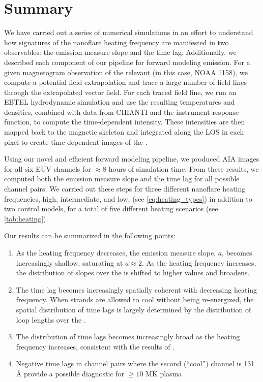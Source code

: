 
\section{Summary}\label{conclusions}

We have carried out a series of numerical simulations in an effort to understand how signatures of the nanoflare heating frequency are manifested in two observables: the emission measure slope and the time lag. Additionally, we described each component of our pipeline for forward modeling \AR{} emission. For a given magnetogram observation of the relevant \AR{} (in this case, NOAA 1158), we compute a potential field extrapolation and trace a large number of field lines through the extrapolated vector field. For each traced field line, we run an EBTEL hydrodynamic simulation and use the resulting temperatures and densities, combined with data from CHIANTI and the instrument response function, to compute the time-dependent intensity. These intensities are then mapped back to the magnetic skeleton and integrated along the LOS in each pixel to create time-dependent images of the \AR{}.

Using our novel and efficient forward modeling pipeline, we produced AIA images for all six EUV channels for $\approx8$ hours of simulation time. From these results, we computed both the emission measure slope and the time lag for all possible channel pairs. We carried out these steps for three different nanoflare heating frequencies, high, intermediate, and low, (see \autoref{eq:heating_types}) in addition to two control models, for a total of five different heating scenarios (see \autoref{tab:heating}).

Our results can be summarized in the following points:
\begin{enumerate}
    \item As the heating frequency decreases, the emission measure slope, $a$, becomes increasingly shallow, saturating at $a\approx2$. As the heating frequency increases, the distribution of slopes over the \AR{} is shifted to higher values and broadens.
    \item The time lag becomes increasingly spatially coherent with decreasing heating frequency. When strands are allowed to cool without being re-energized, the spatial distribution of time lags is largely determined by the distribution of loop lengths over the \AR{}.
    \item The distribution of time lags becomes increasingly broad as the heating frequency increases, consistent with the results of \citet{viall_signatures_2016}.
    \item Negative time lags in channel pairs where the second (``cool'') channel is 131 \AA{} provide a possible diagnostic for $\ge10$ MK plasma
\end{enumerate}

